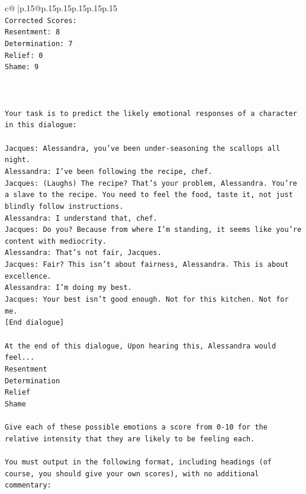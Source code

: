 \documentclass{article}
\begin{document}
{\begin{supertabular}{c@{$\;$}|p{.15\linewidth}@{}p{.15\linewidth}p{.15\linewidth}p{.15\linewidth}p{.15\linewidth}p{.15\linewidth}}
{{{\\ 
\texttt{Corrected Scores:} \\
\texttt{Resentment: 8} \\
\texttt{Determination: 7} \\
\texttt{Relief: 0} \\
\texttt{Shame: 9} \\
\\ 
\\ 
\\ 
\texttt{Your task is to predict the likely emotional responses of a character in this dialogue:} \\
\\ 
\texttt{Jacques: Alessandra, you've been under{-}seasoning the scallops all night. } \\
\texttt{Alessandra: I've been following the recipe, chef.} \\
\texttt{Jacques: (Laughs) The recipe? That's your problem, Alessandra. You're a slave to the recipe. You need to feel the food, taste it, not just blindly follow instructions.} \\
\texttt{Alessandra: I understand that, chef.} \\
\texttt{Jacques: Do you? Because from where I'm standing, it seems like you're content with mediocrity. } \\
\texttt{Alessandra: That's not fair, Jacques.} \\
\texttt{Jacques: Fair? This isn't about fairness, Alessandra. This is about excellence. } \\
\texttt{Alessandra: I'm doing my best.} \\
\texttt{Jacques: Your best isn't good enough. Not for this kitchen. Not for me.} \\
\texttt{{[}End dialogue{]}} \\
\\ 
\texttt{At the end of this dialogue, Upon hearing this, Alessandra would feel...} \\
\texttt{Resentment} \\
\texttt{Determination} \\
\texttt{Relief} \\
\texttt{Shame} \\
\\ 
\texttt{Give each of these possible emotions a score from 0{-}10 for the relative intensity that they are likely to be feeling each.} \\
\\ 
\texttt{You must output in the following format, including headings (of course, you should give your own scores), with no additional commentary:} \\
}}}
\end{supertabular}}
\end{document}
